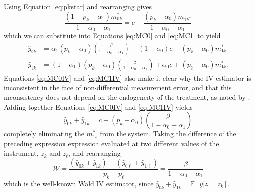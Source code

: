 Using Equation \ref{eq:pkstar} and rearranging gives 
\begin{equation*}
  \frac{(1 - p_k - \alpha_1) m_{0k}^*}{1 - \alpha_0 - \alpha_1} = c - \frac{(p_k - \alpha_0)m_{1k^*}}{1 - \alpha_0 - \alpha_1}
\end{equation*}
which we can substitute into Equations \ref{eq:MC0} and \ref{eq:MC1} to yield
\begin{align}
  \label{eq:MC0IV}
  \hat{y}_{0k} &=\alpha_1(p_k - \alpha_0)\left(\frac{\beta}{1 - \alpha_0 - \alpha_1}\right) + (1-\alpha_0)c - (p _k -  \alpha_0)m_{1k}^* \\[1.5ex]
  \label{eq:MC1IV}
  \hat{y}_{1k} &=(1-\alpha_1)(p_k - \alpha_0)\left(\frac{\beta}{1 - \alpha_0 - \alpha_1}\right) + \alpha_0 c + (p _k -  \alpha_0)m_{1k}^*.
\end{align}
Equations \ref{eq:MC0IV} and \ref{eq:MC1IV} also make it clear why the IV estimator is inconsistent in the face of non-differential measurement error, and that this inconsistency does not depend on the endogeneity of the treatment, as noted by \cite{FL}.
Adding together Equations \ref{eq:MC0IV} and \ref{eq:MC1IV} yields
\begin{equation*}
  \hat{y}_{0k} + \hat{y}_{1k} = c + (p_k - \alpha_0)\left( \frac{\beta}{1 - \alpha_0 - \alpha_1} \right) 
\end{equation*}
completely eliminating the $m^*_{1k}$ from the system.
Taking the difference of the preceding expression expression evaluated at two different values of the instrument, $z_{k}$ and $z_{\ell}$, and rearranging
\begin{equation}
  \mathcal{W} = \frac{(\hat{y}_{0k} + \hat{y}_{1k}) - (\hat{y}_{0\ell} + \hat{y}_{1\ell})}{p_k - p_\ell} =  \frac{\beta}{1 - \alpha_0 - \alpha_1}
  \label{eq:wald}
\end{equation}
which is the well-known Wald IV estimator, since $\hat{y}_{0k} + \hat{y}_{1k} = \mathbb{E}[y|z = z_k]$.

